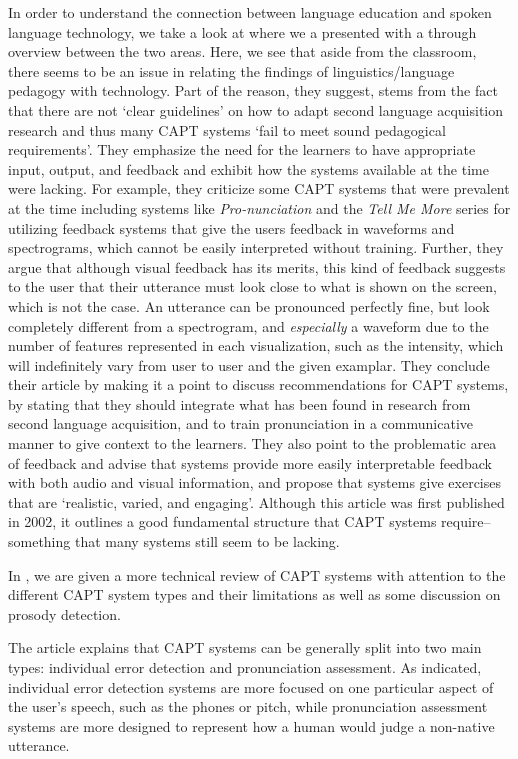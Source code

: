 \documentclass
[
    a4paper,
    twoside,
    12pt,
]
{report}
\begin{document}
In order to understand the connection between language education and
spoken language technology, we take a look at \textcite{neri2002} where
we a presented with a through overview between the two areas. Here, we
see that aside from the classroom, there seems to be an issue in
relating the findings of linguistics/language pedagogy with technology.
Part of the reason, they suggest, stems from the fact that there are not
`clear guidelines' on how to adapt second language acquisition research
and thus many CAPT systems `fail to meet sound pedagogical
requirements'. They emphasize the need for the learners to have
appropriate input, output, and feedback and exhibit how the systems
available at the time were lacking. For example, they criticize some
CAPT systems that were prevalent at the time including systems like
\textit{Pro-nunciation} and the \textit{Tell Me More} series for
utilizing feedback systems that give the users feedback in waveforms and
spectrograms, which cannot be easily interpreted without training.
Further, they argue that although visual feedback has its merits, this
kind of feedback suggests to the user that their utterance must look
close to what is shown on the screen, which is not the case. An
utterance can be pronounced perfectly fine, but look completely
different from a spectrogram, and \textit{especially} a waveform due to
the number of features represented in each visualization, such as the
intensity, which will indefinitely vary from user to user and the given
examplar. They conclude their article by making it a point to discuss
recommendations for CAPT systems, by stating that they should integrate
what has been found in research from second language acquisition, and to
train pronunciation in a communicative manner to give context to the
learners. They also point to the problematic area of feedback and advise
that systems provide more easily interpretable feedback with both audio
and visual information, and propose that systems give exercises that are
`realistic, varied, and engaging'. Although this article was first
published in 2002, it outlines a good fundamental structure that CAPT
systems require-- something that many systems still seem to be lacking.

In \textcite{eskenazi2009}, we are given a more technical review of CAPT
systems with attention to the different CAPT system types and their
limitations as well as some discussion on prosody detection.

The article explains that CAPT systems can be generally split into two
main types: individual error detection and pronunciation assessment. As
indicated, individual error detection systems are more focused on one
particular aspect of the user's speech, such as the phones or pitch,
while pronunciation assessment systems are more designed to represent
how a human would judge a non-native utterance.
\end{document}
